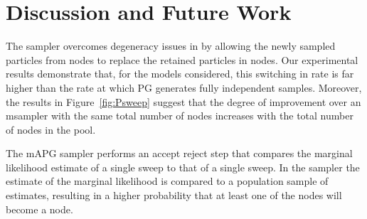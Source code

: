 
\section{Discussion and Future Work}
\label{sec:discussion}

The \ipmcmc sampler overcomes degeneracy issues in \pg by allowing the newly sampled particles from \smc nodes to replace the retained particles in \csmc nodes. Our experimental results demonstrate that, for the models considered, this switching in rate is far higher than the rate at which PG generates fully independent samples. Moreover, the results in Figure~\ref{fig:Psweep} suggest that the degree of improvement over an m\pg sampler with the same total number of nodes increases with the total number of nodes in the pool. 

The mAPG sampler performs an accept reject step that compares the marginal likelihood estimate of a single \csmc sweep to that of a single \smc sweep. In the \ipmcmc sampler the \csmc estimate of the marginal likelihood is compared to a population sample of \smc estimates, resulting in a higher probability that at least one of the \smc nodes will become a \csmc node.




